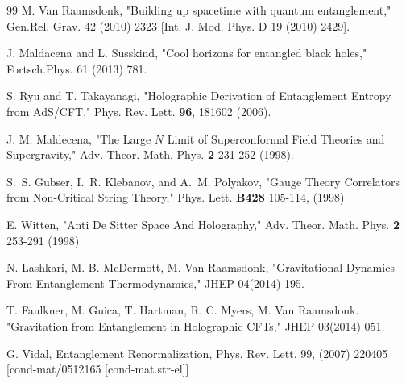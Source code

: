 \documentclass[preprint,aps]{revtex4}
\begin{document}
\begin{thebibliography}{99}
 M. Van Raamsdonk, "Building up spacetime with quantum entanglement," Gen.Rel. Grav. 42 (2010) 2323 [Int. J. Mod. Phys. D 19 (2010) 2429].

 J. Maldacena and L. Susskind, "Cool horizons for entangled black holes," Fortsch.Phys. 61 (2013) 781.

 S. Ryu and T. Takayanagi, "Holographic Derivation of Entanglement Entropy from AdS/CFT," Phys. Rev. Lett. {\bf 96}, 181602 (2006). 


 J. M. Maldecena, "The Large $N$ Limit of Superconformal Field Theories and Supergravity," Adv. Theor. Math. Phys. {\bf 2} 231-252 (1998). 

 S.~S. Gubser, I.~R. Klebanov, and A.~M. Polyakov, "Gauge Theory Correlators from Non-Critical String Theory," Phys. Lett. {\bf B428} 105-114, (1998) 

 E. Witten, "Anti De Sitter Space And Holography," Adv. Theor. Math. Phys. {\bf 2} 253-291 (1998) 

 N. Lashkari, M. B. McDermott, M. Van Raamsdonk, "Gravitational Dynamics From Entanglement Thermodynamics," JHEP 04(2014) 195.

 T. Faulkner, M. Guica, T. Hartman, R. C. Myers, M. Van Raamsdonk. "Gravitation from Entanglement in Holographic CFTs," JHEP 03(2014) 051.


 G. Vidal, Entanglement Renormalization, Phys. Rev. Lett.  99, (2007) 220405 [cond-mat/0512165 [cond-mat.str-el]]


\end{thebibliography}
\end{document}
